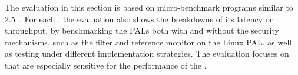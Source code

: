 The evaluation in this section is based on micro-benchmark programs similar to \lmbench{} 2.5~\cite{McVoy:lmbench}.
For each \hostapis{}, the evaluation also shows the breakdowns
of its latency or throughput,
by benchmarking the PALs both with and without the security mechanisms, such as the \seccomp{} filter and reference monitor on the Linux PAL,
as well as testing under different
implementation strategies.
The evaluation focuses on \hostapis{} that are especially sensitive for the performance of the \graphene{} \libos{}.




















